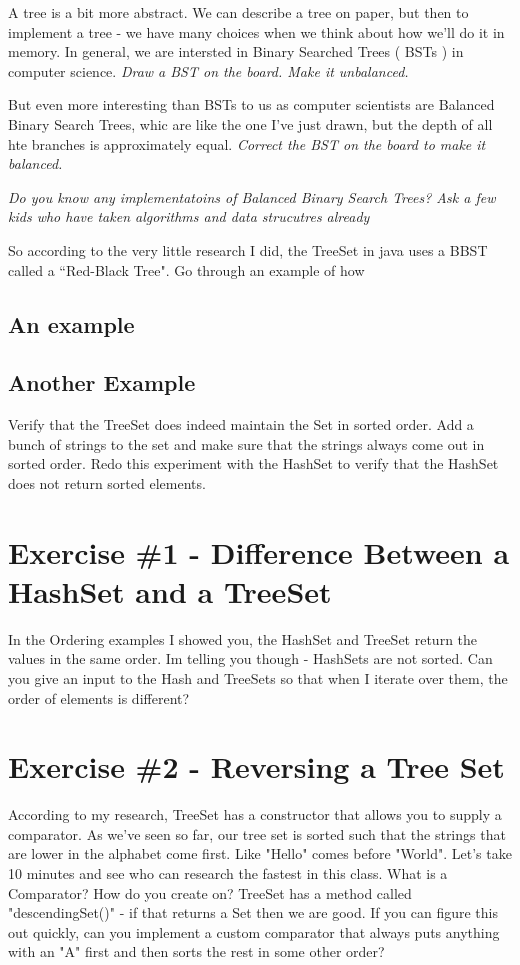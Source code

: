 \documentclass[12pt]{article}
\begin{document}
A tree is a bit more abstract. We can describe a tree on paper, but then to implement a tree - we have many choices when we think about how we'll do it in memory. In general, we are intersted in Binary Searched Trees ( BSTs ) in computer science. \textit{Draw a BST on the board. Make it unbalanced.}

But even more interesting than BSTs to us as computer scientists are Balanced Binary Search Trees, whic are like the one I've just drawn, but the depth of all hte branches is approximately equal. \textit{Correct the BST on the board to make it balanced.}

{\LARGE\textit{Do you know any implementatoins of Balanced Binary Search Trees? Ask a few kids who have taken algorithms and data strucutres already}}

So according to the very little research I did, the TreeSet in java uses a BBST called a ``Red-Black Tree". Go through an example of how 


\subsection{An example}



\subsection{Another Example}
Verify that the TreeSet does indeed maintain the Set in sorted order. Add a bunch of strings to the set and make sure that the strings always come out in sorted order.
Redo this experiment with the HashSet to verify that the HashSet does not return sorted elements.


\section{Exercise  \#1 - Difference Between a HashSet and a TreeSet}
In the Ordering examples I showed you, the HashSet and TreeSet return the values in the same order. Im telling you though - HashSets are not sorted. Can you give an input to the Hash and TreeSets so that when I iterate over them, the order of elements is different?

\section{Exercise \#2 - Reversing a Tree Set}
According to my research, TreeSet has a constructor that allows you to supply a comparator. As we've seen so far, our tree set is sorted such that the strings that are lower in the alphabet come first. Like "Hello" comes before "World". Let's take 10 minutes and see who can research the fastest in this class. What is a Comparator? How do you create on? TreeSet has a method called "descendingSet()" - if that returns a Set then we are good. If you can figure this out quickly, can you implement a custom comparator that always puts anything with an "A" first and then sorts the rest in some other order?
\end{document}

